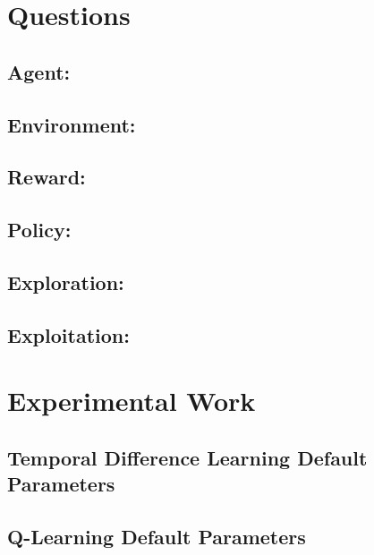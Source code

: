 \documentclass{assignment}
\date{\today}
\begin{document}
\section{Questions}
\subsection{Agent: }
\subsection{Environment: }
\subsection{Reward: }
\subsection{Policy: }
\subsection{Exploration: }
\subsection{Exploitation: }


\section{Experimental Work}
\subsection{Temporal Difference Learning Default Parameters}

\subsection{Q-Learning Default Parameters}
\end{document}
